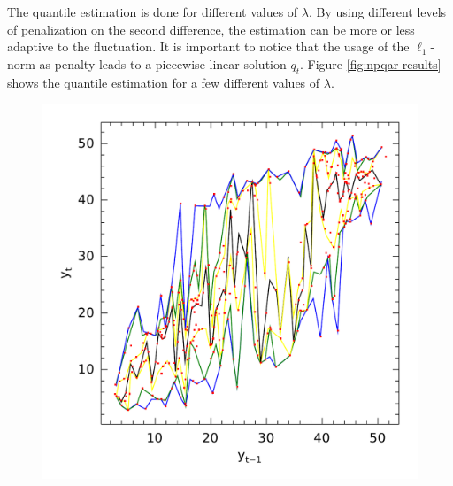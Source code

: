 The quantile estimation is done for different values of $\lambda$. By using different levels of penalization on the second difference, the estimation can be more or less adaptive to the fluctuation. It is important to notice that the usage of the $\ell_1$-norm as penalty leads to a piecewise linear solution $q_t$. %
Figure \ref{fig:npqar-results} shows the quantile estimation for a few different values of $\lambda$. 

\begin{figure}[htp]
  \centering
  \begin{minipage}[t]{0.4\linewidth}
    \centering
    \begin{minipage}[t]{\linewidth}
      \centering     \includegraphics[width=\textwidth]{Figuras/npqar/icaraizinho-crossing-01}
    \end{minipage}
    \begin{minipage}[b]{\linewidth}

\end{minipage}
\end{minipage}
\end{figure}
